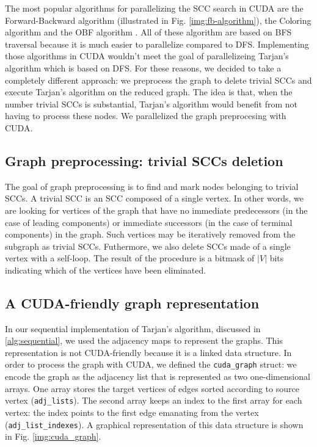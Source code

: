 The most popular algorithms for parallelizing the SCC search in CUDA are the Forward-Backward algorithm (illustrated in Fig. \ref{img:fb-algorithm}), the Coloring algorithm and the OBF algorithm \cite{barnat_bauch_brim_ceka_2011} \cite{usermanual:cuda-sccs}. All of these algorithm are based on BFS traversal because it is much easier to parallelize compared to DFS. Implementing those algorithms in CUDA wouldn't meet the goal of parallelizeing Tarjan's algorithm which is based on DFS. For these reasons, we decided to take a completely different approach: we preprocess the graph to delete trivial SCCs and execute Tarjan's algorithm on the reduced graph. The idea is that, when the number trivial SCCs is substantial, Tarjan's algorithm would benefit from not having to process these nodes. We parallelized the graph preprocesing with CUDA.

\subsection{Graph preprocessing: trivial SCCs deletion}
\label{alg:graph_preprocessing}
The goal of graph preprocessing is to find and mark nodes belonging to trivial SCCs. A trivial SCC is an SCC composed of a single vertex. In other words, we are looking for vertices of the graph that have no immediate predecessors (in the case of leading components) or immediate successors (in the case of terminal components) in the graph. Such vertices may be iteratively removed from the subgraph as trivial SCCs. Futhermore, we also delete SCCs made of a single vertex with a self-loop. The result of the procedure is a bitmask of $|V|$ bits indicating which of the vertices have been eliminated.

\subsection{A CUDA-friendly graph representation}
\label{rep:cuda_graph}
In our sequential implementation of Tarjan's algorithm, discussed in \ref{alg:sequential}, we used the adjacency maps to represent the graphs. This representation is not CUDA-friendly because it is a linked data structure. In order to process the graph with CUDA, we defined the \verb|cuda_graph| struct: we encode the graph as the adjacency list that is represented as two one-dimensional arrays. One array stores the target vertices of edges sorted according to source vertex (\verb|adj_lists|). The second array keeps an index to the first array for each vertex: the index points to the first edge emanating from the vertex (\verb|adj_list_indexes|). A graphical representation of this data structure is shown in Fig. \ref{img:cuda_graph}.

